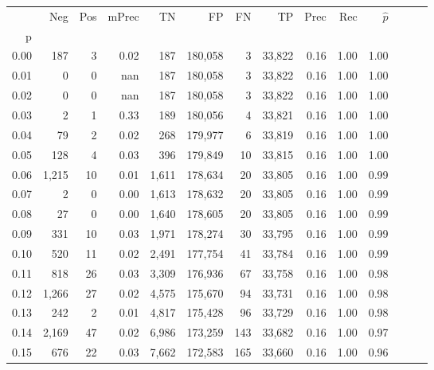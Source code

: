 \begin{tabular}{rrrrrrrrrrrrrr}
\toprule
{} &     Neg &    Pos & mPrec &       TN &       FP &      FN &      TP &  Prec &   Rec & $\hat{p}$ \\
p    &         &        &       &          &          &         &         &       &       &           \\
\midrule
0.00 &     187 &      3 &  0.02 &      187 &  180,058 &       3 &  33,822 &  0.16 &  1.00 &      1.00 \\
0.01 &       0 &      0 &   nan &      187 &  180,058 &       3 &  33,822 &  0.16 &  1.00 &      1.00 \\
0.02 &       0 &      0 &   nan &      187 &  180,058 &       3 &  33,822 &  0.16 &  1.00 &      1.00 \\
0.03 &       2 &      1 &  0.33 &      189 &  180,056 &       4 &  33,821 &  0.16 &  1.00 &      1.00 \\
0.04 &      79 &      2 &  0.02 &      268 &  179,977 &       6 &  33,819 &  0.16 &  1.00 &      1.00 \\
0.05 &     128 &      4 &  0.03 &      396 &  179,849 &      10 &  33,815 &  0.16 &  1.00 &      1.00 \\
0.06 &   1,215 &     10 &  0.01 &    1,611 &  178,634 &      20 &  33,805 &  0.16 &  1.00 &      0.99 \\
0.07 &       2 &      0 &  0.00 &    1,613 &  178,632 &      20 &  33,805 &  0.16 &  1.00 &      0.99 \\
0.08 &      27 &      0 &  0.00 &    1,640 &  178,605 &      20 &  33,805 &  0.16 &  1.00 &      0.99 \\
0.09 &     331 &     10 &  0.03 &    1,971 &  178,274 &      30 &  33,795 &  0.16 &  1.00 &      0.99 \\
0.10 &     520 &     11 &  0.02 &    2,491 &  177,754 &      41 &  33,784 &  0.16 &  1.00 &      0.99 \\
0.11 &     818 &     26 &  0.03 &    3,309 &  176,936 &      67 &  33,758 &  0.16 &  1.00 &      0.98 \\
0.12 &   1,266 &     27 &  0.02 &    4,575 &  175,670 &      94 &  33,731 &  0.16 &  1.00 &      0.98 \\
0.13 &     242 &      2 &  0.01 &    4,817 &  175,428 &      96 &  33,729 &  0.16 &  1.00 &      0.98 \\
0.14 &   2,169 &     47 &  0.02 &    6,986 &  173,259 &     143 &  33,682 &  0.16 &  1.00 &      0.97 \\
0.15 &     676 &     22 &  0.03 &    7,662 &  172,583 &     165 &  33,660 &  0.16 &  1.00 &      0.96 \\

\end{tabular}
